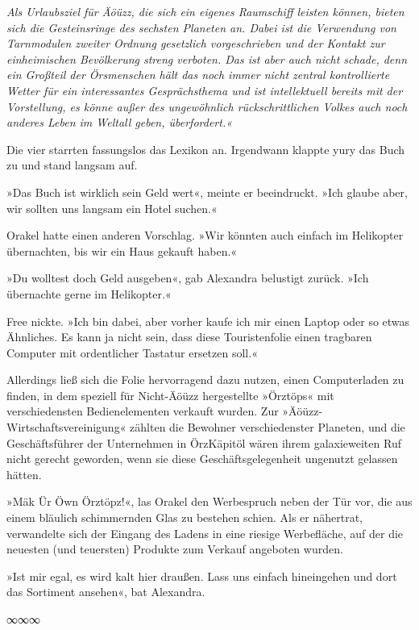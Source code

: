 \textit{Als Urlaubsziel für Äöüzz, die sich ein eigenes Raumschiff leisten können, bieten sich die Gesteinsringe des sechsten Planeten an. Dabei ist die Verwendung von Tarnmodulen zweiter Ordnung gesetzlich vorgeschrieben und der Kontakt zur einheimischen Bevölkerung streng verboten. Das ist aber auch nicht schade, denn ein Großteil der Örsmenschen hält das noch immer nicht zentral kontrollierte Wetter für ein interessantes Gesprächsthema und ist intellektuell bereits mit der Vorstellung, es könne außer des ungewöhnlich rückschrittlichen Volkes auch noch anderes Leben im Weltall geben, überfordert.«}

Die vier starrten fassungslos das Lexikon an. Irgendwann klappte yury das Buch zu und stand langsam auf.

»Das Buch ist wirklich sein Geld wert«, meinte er beeindruckt. »Ich glaube aber, wir sollten uns langsam ein Hotel suchen.«

Orakel hatte einen anderen Vorschlag. »Wir könnten auch einfach im Helikopter übernachten, bis wir ein Haus gekauft haben.«

»Du wolltest doch Geld ausgeben«, gab Alexandra belustigt zurück. »Ich übernachte gerne im Helikopter.«

Free nickte. »Ich bin dabei, aber vorher kaufe ich mir einen Laptop oder so etwas Ähnliches. Es kann ja nicht sein, dass diese Touristenfolie einen tragbaren Computer mit ordentlicher Tastatur ersetzen soll.«

Allerdings ließ sich die Folie hervorragend dazu nutzen, einen Computerladen zu finden, in dem speziell für Nicht-Äöüzz hergestellte »Örztöps« mit verschiedensten Bedienelementen verkauft wurden. Zur »Äöüzz-Wirtschaftsvereinigung« zählten die Bewohner verschiedenster Planeten, und die Geschäftsführer der Unternehmen in ÖrzKäpitöl wären ihrem galaxieweiten Ruf nicht gerecht geworden, wenn sie diese Geschäftsgelegenheit ungenutzt gelassen hätten.

»Mäk Ür Öwn Örztöpz!«, las Orakel den Werbespruch neben der Tür vor, die aus einem bläulich schimmernden Glas zu bestehen schien. Als er nähertrat, verwandelte sich der Eingang des Ladens in eine riesige Werbefläche, auf der die neuesten (und teuersten) Produkte zum Verkauf angeboten wurden.

»Ist mir egal, es wird kalt hier draußen. Lass uns einfach hineingehen und dort das Sortiment ansehen«, bat Alexandra.

\begin{center}
    ∞∞∞
\end{center}

